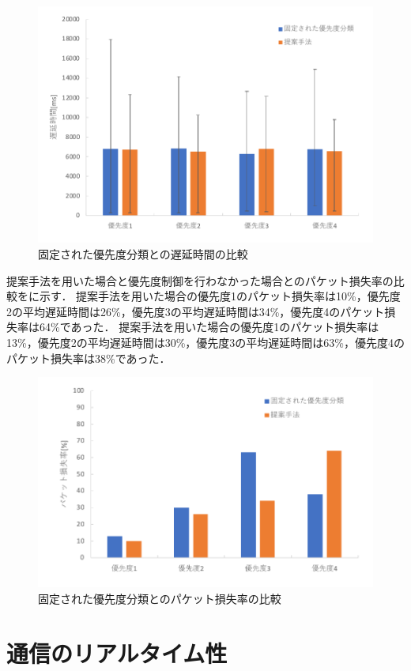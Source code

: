\documentclass[a4paper,11pt,uplatex]{ujreport}
\begin{document}
  \begin{figure}[tb]
    \centering
    \includegraphics[width=0.85\linewidth]{img/RTT_2.pdf}
    \caption{固定された優先度分類との遅延時間の比較}
    \label{fig:RTT_2}
  \end{figure}

  提案手法を用いた場合と優先度制御を行わなかった場合とのパケット損失率の比較をに示す．
  提案手法を用いた場合の優先度1のパケット損失率は10\%，優先度2の平均遅延時間は26\%，優先度3の平均遅延時間は34\%，優先度4のパケット損失率は64\%であった．
  提案手法を用いた場合の優先度1のパケット損失率は13\%，優先度2の平均遅延時間は30\%，優先度3の平均遅延時間は63\%，優先度4のパケット損失率は38\%であった．

  \begin{figure}[tb]
    \centering
    \includegraphics[width=0.85\linewidth]{img/packetloss_2.pdf}
    \caption{固定された優先度分類とのパケット損失率の比較}
    \label{fig:packetloss_2}
  \end{figure}

\section{通信のリアルタイム性}
\label{sec:通信のリアルタイム性}
\end{document}

